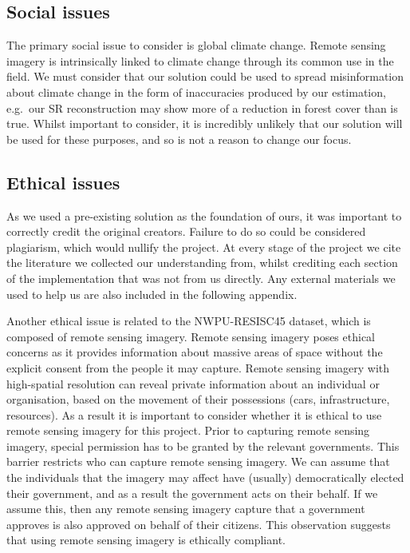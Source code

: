 \begin{appendices}
\subsection{Social issues}
The primary social issue to consider is global climate change. Remote sensing imagery is intrinsically linked to climate change through its common use in the field. We must consider that our solution could be used to spread misinformation about climate change in the form of inaccuracies produced by our estimation, e.g.\ our SR reconstruction may show more of a reduction in forest cover than is true. Whilst important to consider, it is incredibly unlikely that our solution will be used for these purposes, and so is not a reason to change our focus.

\subsection{Ethical issues}
As we used a pre-existing solution as the foundation of ours, it was important to correctly credit the original creators. Failure to do so could be considered plagiarism, which would nullify the project. At every stage of the project we cite the literature we collected our understanding from, whilst crediting each section of the implementation that was not from us directly. Any external materials we used to help us are also included in the following appendix.

Another ethical issue is related to the NWPU-RESISC45 dataset, which is composed of remote sensing imagery. Remote sensing imagery poses ethical concerns as it provides information about massive areas of space without the explicit consent from the people it may capture. Remote sensing imagery with high-spatial resolution can reveal private information about an individual or organisation, based on the movement of their possessions (cars, infrastructure, resources). As a result it is important to consider whether it is ethical to use remote sensing imagery for this project. Prior to capturing remote sensing imagery, special permission has to be granted by the relevant governments. This barrier restricts who can capture remote sensing imagery. We can assume that the individuals that the imagery may affect have (usually) democratically elected their government, and as a result the government acts on their behalf. If we assume this, then any remote sensing imagery capture that a government approves is also approved on behalf of their citizens. This observation suggests that using remote sensing imagery is ethically compliant.


\end{appendices}
